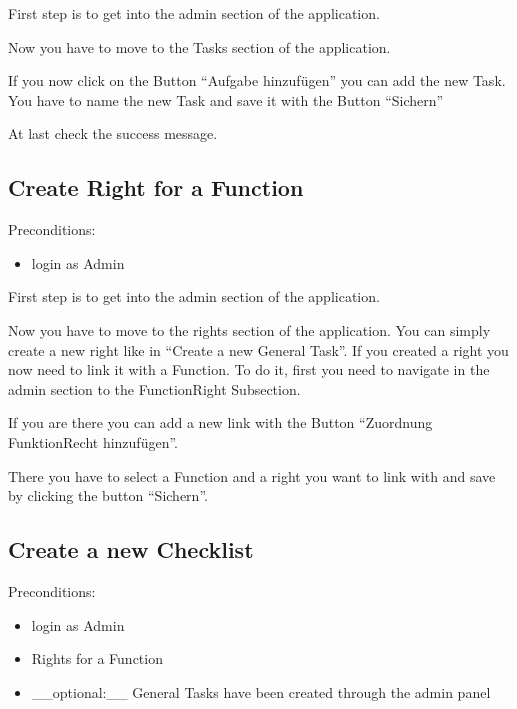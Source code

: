 \documentclass[letterpaper,10pt,english]{sphinxmanual}
\begin{document}
First step is to get into the admin section of the application.

\noindent{}

Now you have to move to the Tasks section of the application.

\noindent{}

If you now click on the Button “Aufgabe hinzufügen” you can add the new Task.
You have to name the new Task and save it with the Button “Sichern”

\noindent{}

At last check the success message.


\subsection{Create Right for a Function}
\label{\detokenize{masterUserDoc:create-right-for-a-function}}
Pre\sphinxhyphen{}conditions:
\begin{itemize}
\item {} 
login as Admin

\end{itemize}

First step is to get into the admin section of the application.

\noindent{}

Now you have to move to the rights section of the application.
You can simply create a new right like in “Create a new General Task”.
If you created a right you now need to link it with a Function.
To do it, first you need to navigate in the admin section to the Function\sphinxhyphen{}Right
Subsection.

\noindent{}

If you are there you can add a new link with the Button
“Zuordnung Funktion\sphinxhyphen{}Recht hinzufügen”.

\noindent{}

There you have to select a Function and a right you want to link with and save
by clicking the button “Sichern”.


\subsection{Create a new Checklist}
\label{\detokenize{masterUserDoc:create-a-new-checklist}}
Pre\sphinxhyphen{}conditions:
\begin{itemize}
\item {} 
login as Admin

\item {} 
Rights for a Function

\item {} 
\_\_optional:\_\_ General Tasks have been created through the admin panel

\end{itemize}
\end{document}
